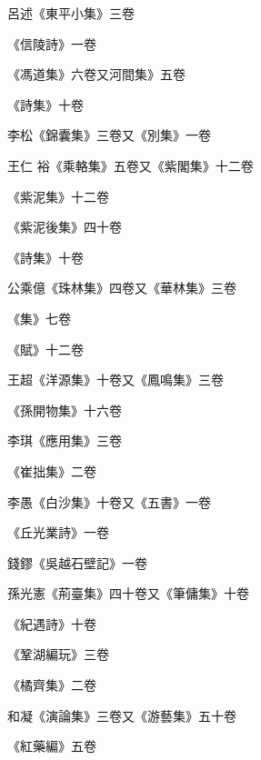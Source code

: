 \begin{pinyinscope}
 呂述《東平小集》三卷



 《信陵詩》一卷



 《馮道集》六卷又河間集》五卷



 《詩集》十卷



 李松《錦囊集》三卷又《別集》一卷



 王仁
 裕《乘輅集》五卷又《紫閣集》十二卷



 《紫泥集》十二卷



 《紫泥後集》四十卷



 《詩集》十卷



 公乘億《珠林集》四卷又《華林集》三卷



 《集》七卷



 《賦》十二卷



 王超《洋源集》十卷又《鳳鳴集》三卷



 《孫開物集》十六卷



 李琪《應用集》三卷



 《崔拙集》二卷



 李愚《白沙集》十卷又《五書》一卷



 《丘光業詩》一卷



 錢鏐《吳越石壁記》一卷



 孫光憲《荊臺集》四十卷又《筆傭集》十卷



 《紀遇詩》十卷



 《鞏湖編玩》三卷



 《橘齊集》二卷



 和凝《演論集》三卷又《游藝集》五十卷



 《紅藥編》五卷




\end{pinyinscope}
